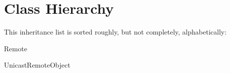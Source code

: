 \section{Class Hierarchy}
This inheritance list is sorted roughly, but not completely, alphabetically\+:\begin{DoxyCompactList}
\item {}
\item Remote\begin{DoxyCompactList}
\item {}
\begin{DoxyCompactList}
\item {}
\end{DoxyCompactList}
\end{DoxyCompactList}
\item Unicast\+Remote\+Object\begin{DoxyCompactList}
\item {}
\end{DoxyCompactList}
\end{DoxyCompactList}
